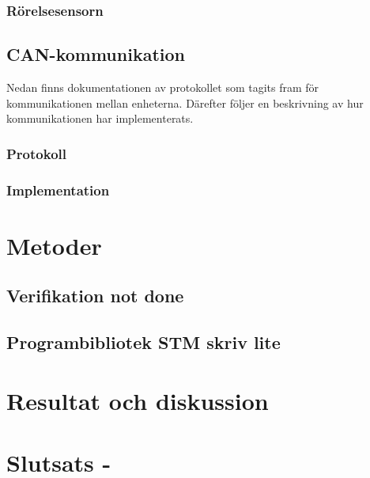 \documentclass{article}
\begin{document}
\subsubsection{Rörelsesensorn}
\subsection{CAN-kommunikation}
\label{can}
Nedan finns dokumentationen av protokollet som tagits fram för kommunikationen mellan enheterna. Därefter följer en beskrivning av hur kommunikationen har implementerats.
\subsubsection{Protokoll}

\subsubsection{Implementation}

\section{Metoder}
\subsection{Verifikation not done}
\subsection{Programbibliotek STM skriv lite}


\section{Resultat och diskussion} %
\section{Slutsats -}
\end{document}
